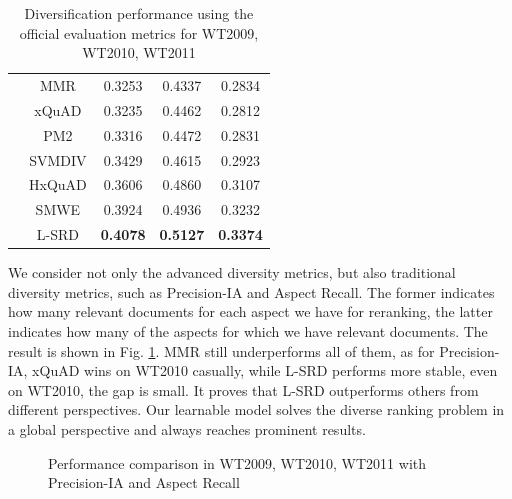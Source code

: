 \documentclass[review]{elsarticle}
\begin{document}
\begin{table}[!htb]
\begin{tabular}{|c|c|c|c|c|}
	                           & MMR    & 0.3253          & 0.4337          & 0.2834          \\
	                           & xQuAD  & 0.3235          & 0.4462          & 0.2812          \\
                               & PM2    & 0.3316          & 0.4472          & 0.2831          \\
							   & SVMDIV & 0.3429          & 0.4615          & 0.2923          \\
							   & HxQuAD & 0.3606          & 0.4860          & 0.3107          \\
							   & SMWE   & 0.3924          & 0.4936          & 0.3232         \\
                               & L-SRD  & \textbf{0.4078} & \textbf{0.5127} & \textbf{0.3374} \\

\hline
\end{tabular}
\caption{Diversification performance using the official evaluation metrics for WT2009, WT2010, WT2011}
\label{tab1}
\end{table}

We consider not only the advanced diversity metrics, but also traditional diversity metrics, such as Precision-IA and Aspect Recall. The former indicates how many relevant documents for each aspect we have for reranking, the latter indicates how many of the aspects for which we have relevant documents. The result is shown in Fig. \ref{fig4}. MMR still underperforms all of them, as for Precision-IA, xQuAD wins on WT2010 casually, while L-SRD performs more stable, even on WT2010, the gap is small. It proves that L-SRD outperforms others from different perspectives. Our learnable model solves the diverse ranking problem in a global perspective and always reaches prominent results.

\begin{figure}[htb]
\centering
{}
\caption{Performance comparison in WT2009, WT2010, WT2011 with Precision-IA and Aspect Recall}
\label{fig4}
\end{figure}
\end{document}
